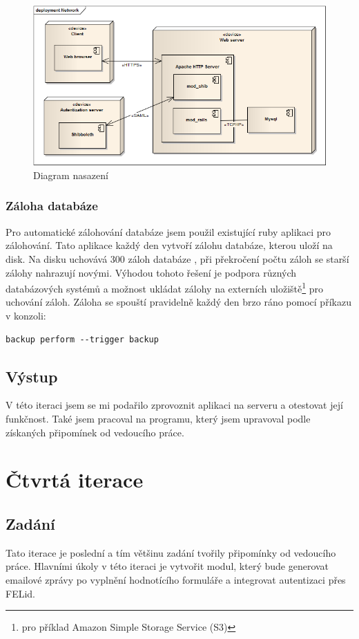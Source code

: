 \begin{figure}[h]
\begin{center}
\includegraphics[width=12cm]{figures/deployment}
\caption{Diagram nasazení}
\label{fig:deployment}
\end{center}
\end{figure}

\subsubsection{Záloha databáze}
Pro automatické zálohování databáze jsem použil existující ruby aplikaci pro zálohování. Tato aplikace každý den vytvoří zálohu databáze, kterou uloží na disk. Na disku uchovává 300 záloh databáze , při překročení počtu záloh se starší zálohy nahrazují novými. Výhodou tohoto řešení je podpora různých databázových systémů a možnost ukládat zálohy na externích uložiště\footnote{pro příklad Amazon Simple Storage Service (S3)} pro uchování záloh. Záloha se spouští pravidelně každý den brzo ráno pomocí příkazu v konzoli:
\begin{verbatim}
backup perform --trigger backup
\end{verbatim} 

\subsection{Výstup} 
V této iteraci jsem se mi podařilo zprovoznit aplikaci na serveru a otestovat její funkčnost. Také jsem pracoval na programu, který jsem upravoval podle získaných připomínek od vedoucího práce.

\section{Čtvrtá iterace}
\subsection{Zadání}
Tato iterace je poslední a tím většinu zadání tvořily připomínky od vedoucího práce. Hlavními úkoly v této iteraci je vytvořit modul, který bude generovat emailové zprávy po vyplnění hodnotícího formuláře a integrovat autentizaci přes FELid. 
